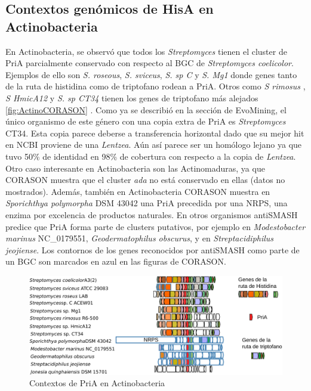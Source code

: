 \documentclass[12pt,twoside]{reedthesis}
\begin{document}
  \subsection{Contextos genómicos de HisA en
  Actinobacteria}\label{contextos-genomicos-de-hisa-en-actinobacteria}
  
  En Actinobacteria, se observó que todos los \emph{Streptomyces} tienen
  el cluster de PriA parcialmente conservado con respecto al BGC de
  \emph{Streptomyces coelicolor}. Ejemplos de ello son \emph{S. roseous},
  \emph{S. sviceus}, \emph{S. sp C} y \emph{S. Mg1} donde genes tanto de
  la ruta de histidina como de triptofano rodean a PriA. Otros como
  \emph{S rimosus} , \emph{S HmicA12} y \emph{S. sp CT34} tienen los genes
  de triptofano más alejados \autoref{fig:ActinoCORASON} . Como ya se
  describió en la sección de EvoMining, el único organismo de este género
  con una copia extra de PriA es \emph{Streptomyces} CT34. Esta copia
  parece deberse a transferencia horizontal dado que su mejor hit en NCBI
  proviene de una \emph{Lentzea}. Aún así parece ser un homólogo lejano ya
  que tuvo 50\% de identidad en 98\% de cobertura con respecto a la copia
  de \emph{Lentzea}. Otro caso interesante en Actinobacteria son las
  Actinomaduras, ya que CORASON muestra que el cluster \emph{ada} no está
  conservado en ellas (datos no mostrados). Además, también en
  Actinobacteria CORASON muestra en \emph{Sporichthya polymorpha} DSM
  43042 una PriA precedida por una NRPS, una enzima por excelencia de
  productos naturales. En otros organismos antiSMASH predice que PriA
  forma parte de clusters putativos, por ejemplo en \emph{Modestobacter
  marinus} NC\_0179551, \emph{Geodermatophilus obscurus}, y en
  \emph{Streptacidiphilus jeojiense}. Los contornos de los genes
  reconocidos por antiSMASH como parte de un BGC son marcados en azul en
  las figuras de CORASON.
  
  \begin{figure}[h!tbp]
    \centering
    \includegraphics[angle = 0,scale = 0.9]{chapter4/CORASON/ActinoCORASON.pdf}
    \caption[Contextos de PriA en Actinobacteria]{\footnotesize{Contextos de PriA en Actinobacteria}}
    \label{fig:ActinoCORASON}
    \end{figure}
  
\end{document}
